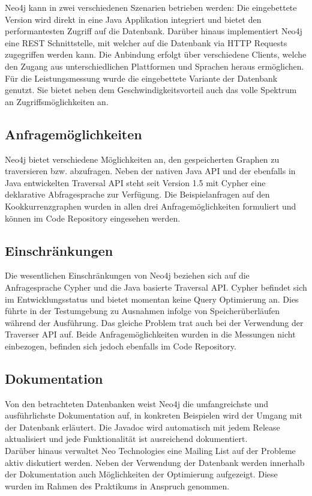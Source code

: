 \documentclass[11pt, a4paper, oneside]{article} %
\begin{document}
Neo4j kann in zwei verschiedenen Szenarien betrieben werden: Die eingebettete Version wird direkt in eine Java Applikation integriert und bietet den performantesten Zugriff auf die Datenbank. Darüber hinaus implementiert Neo4j eine REST Schnittstelle, mit welcher auf die Datenbank via HTTP Requests zugegriffen werden kann. Die Anbindung erfolgt über verschiedene Clients, welche den Zugang aus unterschiedlichen Plattformen und Sprachen heraus ermöglichen.\\
Für die Leistungsmessung wurde die eingebettete Variante der Datenbank genutzt. Sie bietet neben dem Geschwindigkeitsvorteil auch das volle Spektrum an Zugriffsmöglichkeiten an.

\subsection{Anfragemöglichkeiten}

Neo4j bietet verschiedene Möglichkeiten an, den gespeicherten Graphen zu traversieren bzw. abzufragen. Neben der nativen Java API und der ebenfalls in Java entwickelten Traversal API steht seit Version 1.5 mit Cypher eine deklarative Abfragesprache zur Verfügung. Die Beispielanfragen auf den Kookkurrenzgraphen wurden in allen drei Anfragemöglichkeiten formuliert und können im Code Repository eingesehen werden.

\subsection{Einschränkungen}

Die wesentlichen Einschränkungen von Neo4j beziehen sich auf die Anfragesprache Cypher und die Java basierte Traversal API. Cypher befindet sich im Entwicklungsstatus und bietet momentan keine Query Optimierung an. Dies führte in der Testumgebung zu Ausnahmen infolge von Speicherüberläufen während der Ausführung. Das gleiche Problem trat auch bei der Verwendung der Traverser API auf. Beide Anfragemöglichkeiten wurden in die Messungen nicht einbezogen, befinden sich jedoch ebenfalls im Code Repository.

\subsection{Dokumentation}

Von den betrachteten Datenbanken weist Neo4j die umfangreichste und ausführlichste Dokumentation auf, in konkreten Beispielen wird der Umgang mit der Datenbank erläutert. Die Javadoc wird automatisch mit jedem Release aktualisiert und jede Funktionalität ist ausreichend dokumentiert.\\
Darüber hinaus verwaltet Neo Technologies eine Mailing List auf der Probleme aktiv diskutiert werden. Neben der Verwendung der Datenbank werden innerhalb der Dokumentation auch Möglichkeiten der Optimierung aufgezeigt. Diese wurden im Rahmen des Praktikums in Anspruch genommen.
\end{document}
